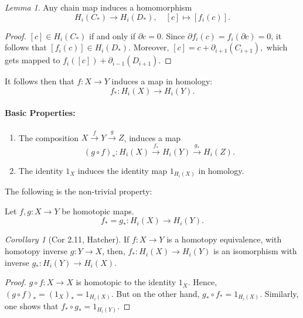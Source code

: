 \documentclass[a4paper]{report}
\theoremstyle{definition}
\theoremstyle{remark}
\theoremstyle{proposition}
\theoremstyle{conjecture}
\theoremstyle{lemma}
\newtheorem{lemma}{Lemma}
\theoremstyle{corollary}
\newtheorem{corollary}{Corollary}
\theoremstyle{exercise}
\begin{document}
\begin{lemma}
    Any chain map induces a homomorphism 
    $$H_i(C_\ast) \longrightarrow H_i(D_\ast),\quad [c] \longmapsto [f_i(c)].$$
\end{lemma}
\begin{proof}
    $[c] \in H_i(C_\ast)$ if and only if $\partial c = 0$.
    Since $\partial f_i(c) = f_i (\partial c) = 0$, 
    it follows that $[f_i(c)] \in H_i(D_\ast)$.
    Moreover, 
    $[c] = c + \partial_{i+1}(C_{i+1}),$ 
    which gets mapped to $f_i([c]) + \partial_{i-1}(D_{i+1})$.
\end{proof}

It follows then that $f : X \to Y$ induces a map in homology:
$$f_\ast : H_i(X) \longrightarrow H_i(Y).$$

\paragraph{Basic Properties:} 
\begin{enumerate}
    \item The composition $X \stackrel{f}{\to} Y \stackrel{g}{\to} Z$, induces a map 
    $$(g\circ f)_\ast : H_i(X) \stackrel{f_\ast}{\longrightarrow} H_i(Y) \stackrel{g_\ast}{\longrightarrow} H_i(Z).$$
    \item The identity $1_X$ induces the identity map $1_{H_i(X)}$ in homology.
\end{enumerate}

The following is the non-trivial property:

\begin{theorem}\label{thm2.10}
    Let $f,g : X \to Y$ be homotopic maps. 
    $$f_\ast = g_\ast : H_i(X) \longrightarrow H_i(Y).$$
\end{theorem}

\begin{corollary}[Cor 2.11, Hatcher]
    If $f : X \to Y$ is a homotopy equivalence, with homotopy inverse $g : Y \to X$,
    then, $f_\ast : H_i(X) \to H_i(Y)$ is an isomorphism with inverse 
    $g_\ast : H_i(Y) \to H_i(X)$.
\end{corollary}

\begin{proof}
    $g\circ f : X \to X$ is homotopic to the identity $1_X$. Hence, $(g \circ f)_\ast = (1_X)_\ast = 1_{H_i(X)}$.
    But on the other hand, $g_\ast \circ f_\ast = 1_{H_i(X)}$. Similarly, one shows that $f_\ast \circ g_\ast = 1_{H_i(Y)}$.
\end{proof}
\end{document}
